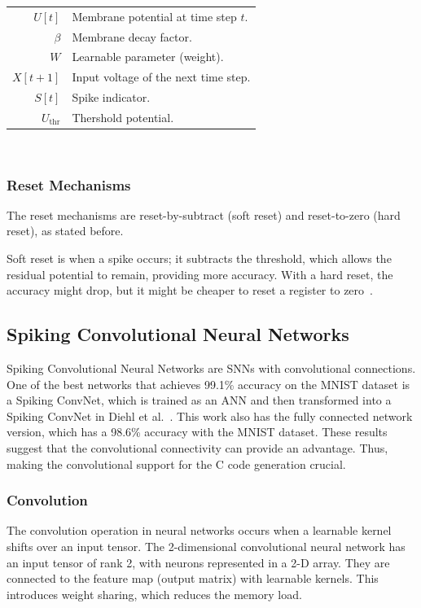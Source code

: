 \documentclass[11pt,a4paper]{article}
\begin{document}
\begin{tabular}{r l}
  $U[t]$ & Membrane potential at time step $t$. \\[0.5em]
  $\beta$ & Membrane decay factor. \\[0.5em]
  $W$ & Learnable parameter (weight). \\[0.5em]
  $X[t+1]$ & Input voltage of the next time step. \\[0.5em]
  $S[t]$ & Spike indicator. \\[0.5em]
  $U_{\text{thr}}$ & Thershold potential. 
\end{tabular}
\\

\subsubsection{Reset Mechanisms}

The reset mechanisms are reset-by-subtract (soft reset) and reset-to-zero (hard reset), as stated before.

Soft reset is when a spike occurs; it subtracts the threshold, which allows the residual potential to remain, providing more accuracy.
With a hard reset, the accuracy might drop, but it might be cheaper to reset a register to zero~\cite{eshraghian2023training}.


\subsection{Spiking Convolutional Neural Networks}
Spiking Convolutional Neural Networks are SNNs with convolutional connections. 
One of the best networks that achieves 99.1\% accuracy on the MNIST dataset is a Spiking ConvNet, which is trained as an ANN and then transformed into a Spiking ConvNet in Diehl et al.~\cite{diehl2015fast}.
This work also has the fully connected network version, which has a 98.6\% accuracy with the MNIST dataset. 
These results suggest that the convolutional connectivity can provide an advantage. 
Thus, making the convolutional support for the C code generation crucial.

\subsubsection{Convolution}
The convolution operation in neural networks occurs when a learnable kernel shifts over an input tensor.
The 2-dimensional convolutional neural network has an input tensor of rank 2, with neurons represented in a 2-D array.
They are connected to the feature map (output matrix) with learnable kernels.
This introduces weight sharing, which reduces the memory load.
\end{document}
